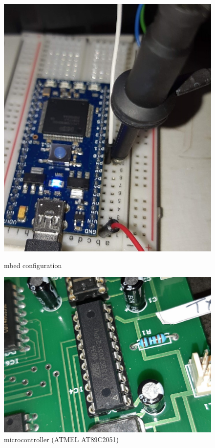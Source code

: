 \documentclass[12pt, a4paper]{article}
\begin{document}
\begin{figure}[ht]
	\begin{minipage}[b]{0.45\linewidth}
		\centering
		\includegraphics[width=\textwidth]{mbed}
		\caption{mbed configuration}
		\label{fig:mbed}
	\end{minipage}
	\hfill%
	\begin{minipage}[b]{0.45\linewidth}
		\centering
		\includegraphics[width=\textwidth, angle=-90]{microcontroller}
		\caption{microcontroller (ATMEL AT89C2051)}
		\label{fig:microcontroller}
	\end{minipage}
\end{figure}
\end{document}
